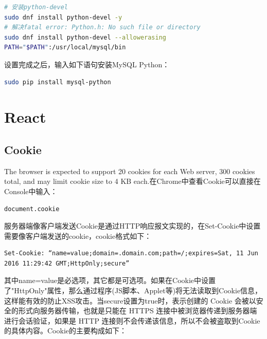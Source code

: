 \documentclass[letter]{book}
\begin{document}
\begin{lstlisting}[language=Bash]
# 安装python-devel
sudo dnf install python-devel -y
# 解决fatal error: Python.h: No such file or directory
sudo dnf install python-devel --allowerasing
PATH="$PATH":/usr/local/mysql/bin
\end{lstlisting}

设置完成之后，输入如下语句安装MySQL Python：

\begin{lstlisting}[language=Bash]
sudo pip install mysql-python
\end{lstlisting}

\section{React}

\subsection{Cookie}

The browser is expected to support 20 cookies for each Web server, 300 cookies total, and may limit cookie size to 4 KB each.在Chrome中查看Cookie可以直接在Console中输入：

\begin{lstlisting}[language=Bash]
document.cookie
\end{lstlisting}

服务器端像客户端发送Cookie是通过HTTP响应报文实现的，在Set-Cookie中设置需要像客户端发送的cookie，cookie格式如下：

\begin{lstlisting}
Set-Cookie: “name=value;domain=.domain.com;path=/;expires=Sat, 11 Jun 2016 11:29:42 GMT;HttpOnly;secure”
\end{lstlisting}

其中name=value是必选项，其它都是可选项。如果在Cookie中设置了"HttpOnly"属性，那么通过程序(JS脚本、Applet等)将无法读取到Cookie信息，这样能有效的防止XSS攻击。当secure设置为true时，表示创建的 Cookie 会被以安全的形式向服务器传输，也就是只能在 HTTPS 连接中被浏览器传递到服务器端进行会话验证，如果是 HTTP 连接则不会传递该信息，所以不会被盗取到Cookie 的具体内容。Cookie的主要构成如下：
\end{document}

